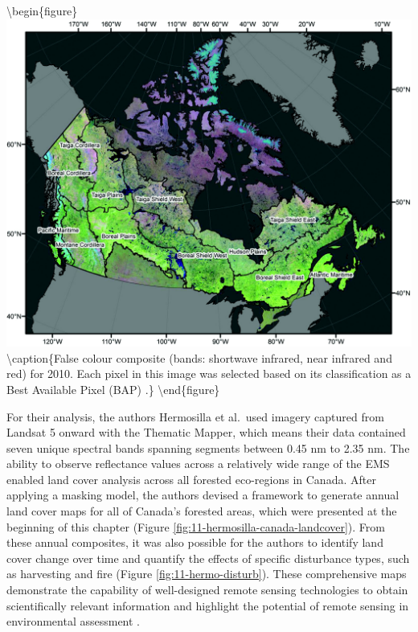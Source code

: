 \documentclass[
]{book}
\begin{document}
\textbackslash begin\{figure\}
\includegraphics[width=0.9\linewidth]{images/11-hermosilla-false-colour} \textbackslash caption\{False colour composite (bands: shortwave infrared, near infrared and red) for 2010. Each pixel in this image was selected based on its classification as a Best Available Pixel (BAP) \citep{hermosilla_disturbance-informed_2018}.\}\label{fig:11-hermo-false}
\textbackslash end\{figure\}

For their analysis, the authors Hermosilla et al.~used imagery captured from
Landsat 5 onward with the Thematic Mapper, which means their data
contained seven unique spectral bands spanning segments between 0.45 nm
to 2.35 nm. The ability to observe reflectance values across a
relatively wide range of the EMS enabled land cover analysis across all
forested eco-regions in Canada. After applying a masking model, the
authors devised a framework to generate annual land cover maps for
all of Canada's forested areas, which were presented at the beginning of
this chapter (Figure \ref{fig:11-hermosilla-canada-landcover}). From
these annual composites, it was also possible for the authors to
identify land cover change over time and quantify the effects of
specific disturbance types, such as harvesting and fire (Figure
\ref{fig:11-hermo-disturb}). These comprehensive maps demonstrate the
capability of well-designed remote sensing technologies to obtain
scientifically relevant information and highlight the potential of
remote sensing in environmental assessment \citep{hermosilla_disturbance-informed_2018}.
\end{document}
